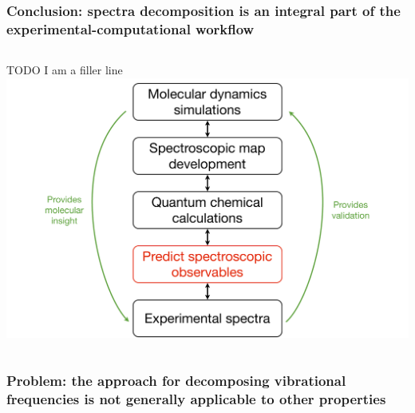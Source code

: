 \documentclass[%
    xcolor=usenames,dvipsnames,svgnames%
]{beamer}
\begin{document}
\begin{frame}
  \frametitle{Conclusion: spectra decomposition is an integral part of the experimental-computational workflow}
  \begin{columns}
    TODO I am a filler line
    \includegraphics[width=\linewidth,keepaspectratio]{./figures/workflow.pdf}
  \end{columns}
\end{frame}

\begin{frame}
  \frametitle{Problem: the approach for decomposing vibrational frequencies is not generally applicable to other properties}
\end{frame}
\end{document}
